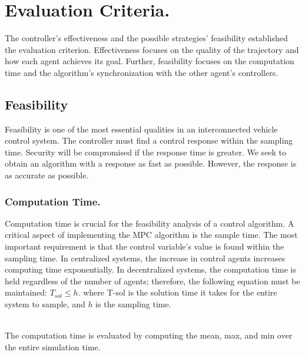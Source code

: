 \section{Evaluation Criteria.}

The controller's effectiveness and the possible strategies' feasibility established the evaluation criterion. Effectiveness focuses on the quality of the trajectory and how each agent achieves its goal. Further, feasibility focuses on the computation time and the algorithm's synchronization with the other agent's controllers.

\subsection{Feasibility}
Feasibility is one of the most essential qualities in an interconnected vehicle control system. The controller must find a control response within the sampling time. Security will be compromised if the response time is greater. We seek to obtain an algorithm with a response as fast as possible. However, the response is as accurate as possible.


\subsubsection{Computation Time. }

Computation time is crucial for the feasibility analysis of a control algorithm. A critical aspect of implementing the MPC algorithm is the sample time. The most important requirement is that the control variable's value is found within the sampling time. In centralized systems, the increase in control agents increases computing time exponentially. In decentralized systems, the computation time is held regardless of the number of agents; therefore, the following equation must be maintained: $ T_{sol} \le h$. where T-sol is the solution time it takes for the entire system to sample, and $h$ is the sampling time.

\\
The computation time is evaluated by computing the mean, max, and min over the entire simulation time.



